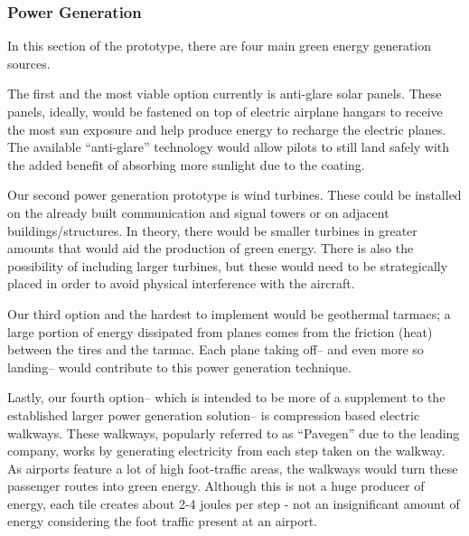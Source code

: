 \documentclass[../main.tex]{subfiles}
\begin{document}
\subsubsection{Power Generation}
In this section of the prototype, there are four main green energy generation sources.\par
The first and the most viable option currently is anti-glare solar panels. These panels, ideally, would be fastened on top of electric airplane hangars to receive the most sun exposure and help produce energy to recharge the electric planes. The available “anti-glare” technology would allow pilots to still land safely with the added benefit of absorbing more sunlight due to the coating.\par
Our second power generation prototype is wind turbines. These could be installed on the already built communication and signal towers or on adjacent buildings/structures. In theory, there would be smaller turbines in greater amounts that would aid the production of green energy. There is also the possibility of including larger turbines, but these would need to be strategically placed in order to avoid physical interference with the aircraft.\par
Our third option and the hardest to implement would be geothermal tarmacs; a large portion of energy dissipated from planes comes from the friction (heat) between the tires and the tarmac. Each plane taking off-- and even more so landing-- would contribute to this power generation technique. \par
Lastly, our fourth option-- which is intended to be more of a supplement to the established larger power generation solution-- is compression based electric walkways. These walkways, popularly referred to as “Pavegen” due to the leading company, works by generating electricity from each step taken on the walkway. As airports feature a lot of high foot-traffic areas, the walkways would turn these passenger routes into green energy. Although this is not a huge producer of energy, each tile creates about 2-4 joules per step - not an insignificant amount of energy considering the foot traffic present at an airport.
\newpage
\end{document}
